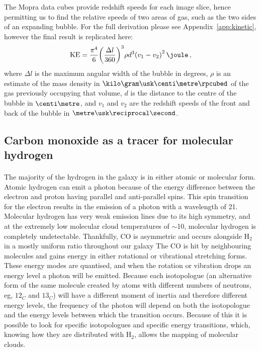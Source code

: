 \documentclass[a4paper, titlepage, oneside]{article}
\newcommand{\molec}[2]{\ensuremath{\text{#1}_{#2}}}
\begin{document}
\begin{multicols}{2}
The Mopra data cubes provide redshift speeds for each image slice, hence permitting us to find the relative speeds of two areas of gas, such as the two sides of an expanding bubble. For the full derivation please see Appendix~\ref{app:kinetic}, however the final result is replicated here:
\begin{equation}
  \label{eq:KE}
  \mathrm{KE} = \frac{\pi ^ 4}{6} {\left( \frac{\Delta l}{360} \right)}^3 \rho d^3 {(v_1 - v_2)}^2 \, \joule \, ,
\end{equation}
where \(\Delta l\) is the maximum angular width of the bubble in degrees, \(\rho\) is an estimate of the mass density in \(\kilo\gram\usk\centi\metre\rpcubed\) of the gas previously occupying that volume, \(d\) is the distance to the centre of the bubble in \(\centi\metre\), and \(v_1\) and \(v_2\) are the redshift speeds of the front and back of the bubble in \(\metre\usk\reciprocal\second\).

\subsection{Carbon monoxide as a tracer for molecular hydrogen}
\label{sec:co}
\paragraph{}
The majority of the hydrogen in the galaxy is in either atomic or molecular form. Atomic hydrogen can emit a photon because of the energy difference between the electron and proton having parallel and anti-parallel spins. This spin transition for the electron results in the emission of a photon with a wavelength of \unit{21}{\centi\metre}. Molecular hydrogen has very weak emission lines due to its high symmetry, and at the extremely low molecular cloud temperatures of \(\sim\)\unit{10}{\kelvin}, molecular hydrogen is completely undetectable. Thankfully, CO is asymmetric and occurs alongside \molec{H}{2} in a mostly uniform ratio throughout our galaxy \parencites{Neininger:1998}{Glover:2011} The CO is hit by neighbouring molecules and gains energy in either rotational or vibrational stretching forms. These energy modes are quantised, and when the rotation or vibration drops an energy level a photon will be emitted. Because each isotopologue (an alternative form of the same molecule created by atoms with different numbers of neutrons, eg, \molec{12}{C} and \molec{13}{C}) will have a different moment of inertia and therefore different energy levels, the frequency of the photon will depend on both the isotopologue and the energy levels between which the transition occurs. Because of this it is possible to look for specific isotopologues and specific energy transitions, which, knowing how they are distributed with \molec{H}{2}, allows the mapping of molecular clouds.


\end{multicols}
\end{document}
